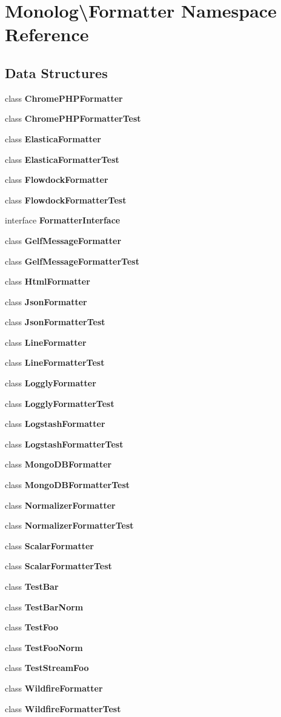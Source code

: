 \section{Monolog\textbackslash{}Formatter Namespace Reference}
\label{namespace_monolog_1_1_formatter}
\subsection*{Data Structures}
\begin{DoxyCompactItemize}
\item 
class {\bf Chrome\+P\+H\+P\+Formatter}
\item 
class {\bf Chrome\+P\+H\+P\+Formatter\+Test}
\item 
class {\bf Elastica\+Formatter}
\item 
class {\bf Elastica\+Formatter\+Test}
\item 
class {\bf Flowdock\+Formatter}
\item 
class {\bf Flowdock\+Formatter\+Test}
\item 
interface {\bf Formatter\+Interface}
\item 
class {\bf Gelf\+Message\+Formatter}
\item 
class {\bf Gelf\+Message\+Formatter\+Test}
\item 
class {\bf Html\+Formatter}
\item 
class {\bf Json\+Formatter}
\item 
class {\bf Json\+Formatter\+Test}
\item 
class {\bf Line\+Formatter}
\item 
class {\bf Line\+Formatter\+Test}
\item 
class {\bf Loggly\+Formatter}
\item 
class {\bf Loggly\+Formatter\+Test}
\item 
class {\bf Logstash\+Formatter}
\item 
class {\bf Logstash\+Formatter\+Test}
\item 
class {\bf Mongo\+D\+B\+Formatter}
\item 
class {\bf Mongo\+D\+B\+Formatter\+Test}
\item 
class {\bf Normalizer\+Formatter}
\item 
class {\bf Normalizer\+Formatter\+Test}
\item 
class {\bf Scalar\+Formatter}
\item 
class {\bf Scalar\+Formatter\+Test}
\item 
class {\bf Test\+Bar}
\item 
class {\bf Test\+Bar\+Norm}
\item 
class {\bf Test\+Foo}
\item 
class {\bf Test\+Foo\+Norm}
\item 
class {\bf Test\+Stream\+Foo}
\item 
class {\bf Wildfire\+Formatter}
\item 
class {\bf Wildfire\+Formatter\+Test}
\end{DoxyCompactItemize}
